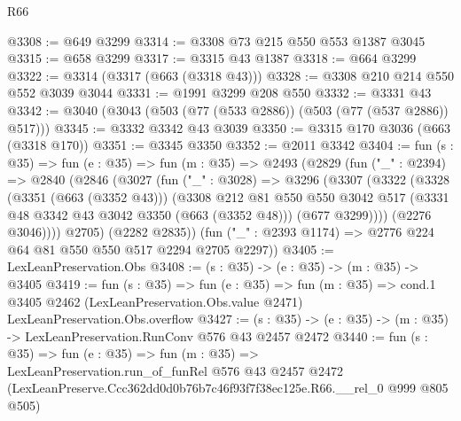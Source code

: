 \begin{lexlean}{R66}
\begin{coremodule}
@3308 := @649 @3299
@3314 := @3308 @73 @215 @550 @553 @1387 @3045
@3315 := @658 @3299
@3317 := @3315 @43 @1387
@3318 := @664 @3299
@3322 := @3314 (@3317 (@663 (@3318 @43)))
@3328 := @3308 @210 @214 @550 @552 @3039 @3044
@3331 := @1991 @3299 @208 @550
@3332 := @3331 @43
@3342 := @3040 (@3043 (@503 (@77 (@533 @2886)) (@503 (@77 (@537 @2886)) @517)))
@3345 := @3332 @3342 @43 @3039
@3350 := @3315 @170 @3036 (@663 (@3318 @170))
@3351 := @3345 @3350
@3352 := @2011 @3342
@3404 := fun (s : @35) =>
  fun (e : @35) =>
  fun (m : @35) =>
  @2493
    (@2829
      (fun ("_" : @2394) =>
      @2840
        (@2846
          (@3027
            (fun ("_" : @3028) =>
            @3296
              (@3307
                (@3322
                  (@3328
                    (@3351 (@663 (@3352 @43)))
                    (@3308
                      @212
                      @81
                      @550
                      @550
                      @3042
                      @517
                      (@3331 @48 @3342 @43 @3042 @3350 (@663 (@3352 @48)))
                      (@677 @3299))))
                (@2276 @3046))))
          @2705)
        (@2282 @2835))
      (fun ("_" : @2393 @1174) => @2776 @224 @64 @81 @550 @550 @517 @2294 @2705 @2297))
@3405 := LexLeanPreservation.Obs
@3408 := (s : @35) -> (e : @35) -> (m : @35) -> @3405
@3419 := fun (s : @35) =>
  fun (e : @35) =>
  fun (m : @35) =>
  cond.{1} @3405 @2462 (LexLeanPreservation.Obs.value @2471) LexLeanPreservation.Obs.overflow
@3427 := (s : @35) -> (e : @35) -> (m : @35) -> LexLeanPreservation.RunConv @576 @43 @2457 @2472
@3440 := fun (s : @35) =>
  fun (e : @35) =>
  fun (m : @35) =>
  LexLeanPreservation.run_of_funRel
    @576
    @43
    @2457
    @2472
    (LexLeanPreserve.Ccc362dd0d0b76b7c46f93f7f38ec125e.R66.__rel_0 @999 @805 @505)
\end{coremodule}
\end{lexlean}
